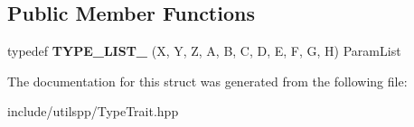 \subsection*{Public Member Functions}
\begin{DoxyCompactItemize}
\item 
\hypertarget{structutilspp_1_1PointerOnMemberFunction_3_01W_07V_1_1_5_08_07X_00_01Y_00_01Z_00_01A_00_01B_00_0c1190c13a8ba22e2b017a7c30228b2d5_a49a5634a0f60b25cd6fbf81f4c870698}{typedef {\bfseries T\-Y\-P\-E\-\_\-\-L\-I\-S\-T\-\_} (X, Y, Z, A, B, C, D, E, F, G, H) Param\-List}\label{structutilspp_1_1PointerOnMemberFunction_3_01W_07V_1_1_5_08_07X_00_01Y_00_01Z_00_01A_00_01B_00_0c1190c13a8ba22e2b017a7c30228b2d5_a49a5634a0f60b25cd6fbf81f4c870698}

\end{DoxyCompactItemize}


The documentation for this struct was generated from the following file\-:\begin{DoxyCompactItemize}
\item 
include/utilspp/Type\-Trait.\-hpp\end{DoxyCompactItemize}
